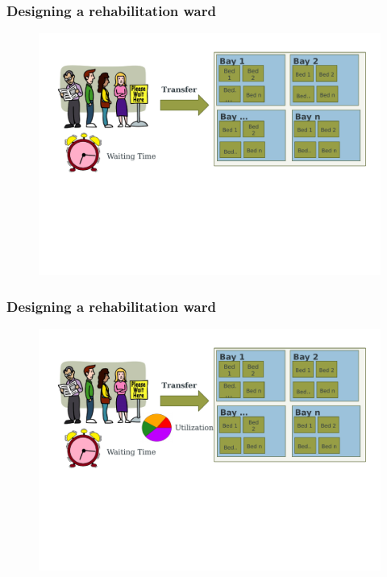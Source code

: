\documentclass[aspectratio=169]{beamer}
\begin{document}


\begin{frame}
\frametitle{Designing a rehabilitation ward}
\begin{figure}
\includegraphics[width=1.0\linewidth]{ward4a.pdf}
\end{figure}
\end{frame}



\begin{frame}
\frametitle{Designing a rehabilitation ward}
\begin{figure}
\includegraphics[width=1.0\linewidth]{ward5a.pdf}
\end{figure}
\end{frame}
\end{document}
